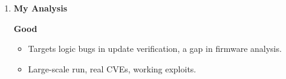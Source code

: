 \documentclass[11pt,a4paper]{article}
\newcommand{\entrypart}[1]{\textbf{\color{accent}#1}\par\vspace{2pt}}
\begin{document}
\begin{enumerate}
    \vspace{4pt}
    \textbf{Limitations (authors)}
    \begin{itemize}
        \item Entry and path heuristics can fail on customized firmware. Analysis then cannot start.
        \item Verification heuristic fails on unconventional designs.
        \item Ground truth is only an approximation (manual work).
        \item Static analysis: false alarms.
        \item Dynamic validation: one path at a time, needs emulation, needs correct patching.
        \item Only 72 of 150 images emulatable. Even lower for bare-metal.
        \item Only OS-based firmware with file systems. Bare-metal not supported.
        \item Unsupported: PHP in update steps, unusual IPC.
        \item Repacking fails on uncommon file systems.
        \item Validation is slow and manual, so limited to 150 images.
    \end{itemize}

    \item \entrypart{My Analysis}

    \textbf{Good}
    \begin{itemize}
        \item Targets logic bugs in update verification, a gap in firmware analysis.
        \item Large-scale run, real CVEs, working exploits.
    \end{itemize}


\end{enumerate}
\end{document}
